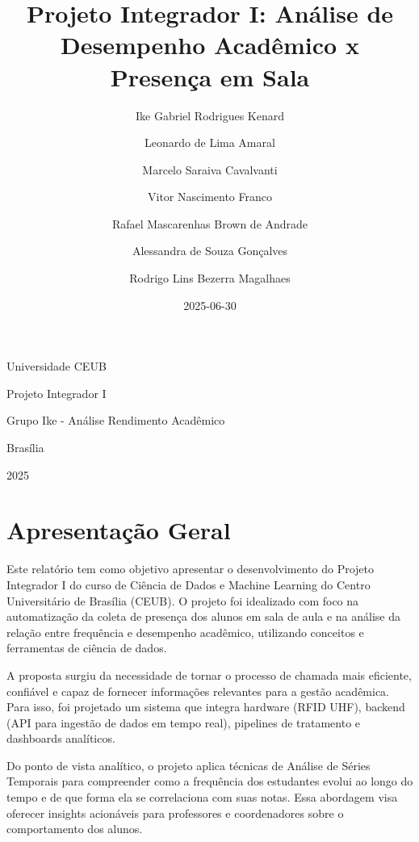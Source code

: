 \documentclass[
  letterpaper,
  DIV=11,
  numbers=noendperiod,
  openany]{scrreprt}
\title{Projeto Integrador I: Análise de Desempenho Acadêmico x Presença
em Sala}
\author{Ike Gabriel Rodrigues Kenard \and Leonardo de Lima
Amaral \and Marcelo Saraiva Cavalvanti \and Vitor Nascimento
Franco \and Rafael Mascarenhas Brown de Andrade \and Alessandra de Souza
Gonçalves \and Rodrigo Lins Bezerra Magalhaes}
\date{2025-06-30}
\renewcommand*\contentsname{Table of contents}
\newcommand\contentsname{Table of contents}
\begin{document}
\maketitle

\begin{titlepage}
    \centering
    \vspace*{5cm}
    {\Large Universidade CEUB \par}
    \vspace{0.5cm}
    {\large Projeto Integrador I \par}
    \vspace{0.5cm}
    {\large Grupo Ike - Análise Rendimento Acadêmico\par}
    \vspace{1cm}
    {\large Brasília \par}
    {\large 2025 \par}
\end{titlepage}

\renewcommand*\contentsname{Table of contents}
{
\hypersetup{linkcolor=}
\setcounter{tocdepth}{2}
\tableofcontents
}


\chapter{Apresentação Geral}\label{apresentauxe7uxe3o-geral}

Este relatório tem como objetivo apresentar o desenvolvimento do Projeto
Integrador I do curso de Ciência de Dados e Machine Learning do Centro
Universitário de Brasília (CEUB). O projeto foi idealizado com foco na
automatização da coleta de presença dos alunos em sala de aula e na
análise da relação entre frequência e desempenho acadêmico, utilizando
conceitos e ferramentas de ciência de dados.

A proposta surgiu da necessidade de tornar o processo de chamada mais
eficiente, confiável e capaz de fornecer informações relevantes para a
gestão acadêmica. Para isso, foi projetado um sistema que integra
hardware (RFID UHF), backend (API para ingestão de dados em tempo real),
pipelines de tratamento e dashboards analíticos.

Do ponto de vista analítico, o projeto aplica técnicas de Análise de
Séries Temporais para compreender como a frequência dos estudantes
evolui ao longo do tempo e de que forma ela se correlaciona com suas
notas. Essa abordagem visa oferecer insights acionáveis para professores
e coordenadores sobre o comportamento dos alunos.
\end{document}
